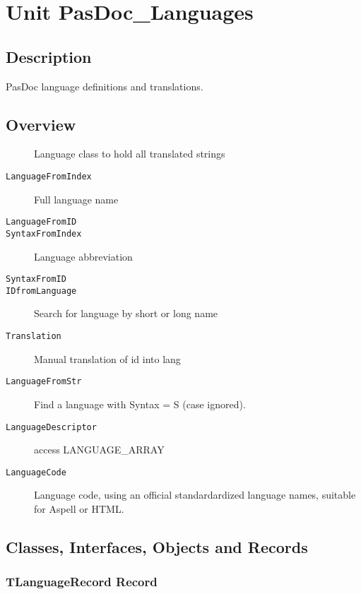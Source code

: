 \documentclass{report}
\newif\ifpdf
\begin{document}
\chapter{Unit PasDoc{\_}Languages}
\label{PasDoc_Languages}
\section{Description}
PasDoc language definitions and translations.\hfill\vspace*{1ex}

                            
\section{Overview}
\begin{description}
\item[\texttt{\begin{ttfamily}TLanguageRecord\end{ttfamily} Record}]
\item[\texttt{\begin{ttfamily}TPasDocLanguages\end{ttfamily} Class}]Language class to hold all translated strings
\end{description}
\begin{description}
\item[\texttt{LanguageFromIndex}]Full language name
\item[\texttt{LanguageFromID}]
\item[\texttt{SyntaxFromIndex}]Language abbreviation
\item[\texttt{SyntaxFromID}]
\item[\texttt{IDfromLanguage}]Search for language by short or long name
\item[\texttt{Translation}]Manual translation of id into lang
\item[\texttt{LanguageFromStr}]Find a language with Syntax = S (case ignored).
\item[\texttt{LanguageDescriptor}]access LANGUAGE{\_}ARRAY
\item[\texttt{LanguageCode}]Language code, using an official standardardized language names, suitable for Aspell or HTML.
\end{description}
\section{Classes, Interfaces, Objects and Records}
\ifpdf
\subsection*{\large{\textbf{TLanguageRecord Record}}\normalsize\hspace{1ex}\hrulefill}
\else
\end{document}
